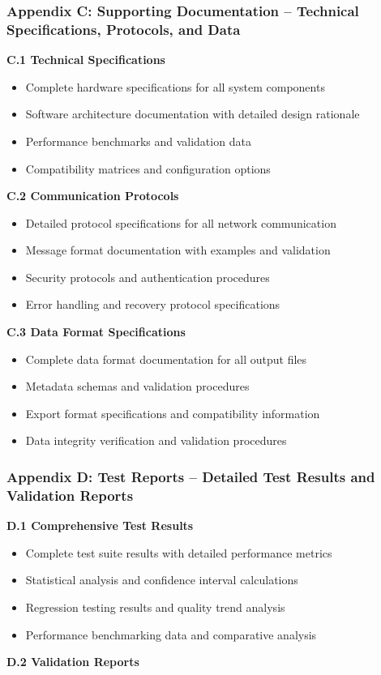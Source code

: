 \documentclass[12pt,a4paper]{report}
\begin{document}
\subsubsection{Appendix C: Supporting Documentation – Technical Specifications, Protocols, and Data}

\textbf{C.1 Technical Specifications}

\begin{itemize}
\item Complete hardware specifications for all system components
\item Software architecture documentation with detailed design rationale
\item Performance benchmarks and validation data
\item Compatibility matrices and configuration options

\end{itemize}
\textbf{C.2 Communication Protocols}

\begin{itemize}
\item Detailed protocol specifications for all network communication
\item Message format documentation with examples and validation
\item Security protocols and authentication procedures
\item Error handling and recovery protocol specifications

\end{itemize}
\textbf{C.3 Data Format Specifications}

\begin{itemize}
\item Complete data format documentation for all output files
\item Metadata schemas and validation procedures
\item Export format specifications and compatibility information
\item Data integrity verification and validation procedures

\end{itemize}
\subsubsection{Appendix D: Test Reports – Detailed Test Results and Validation Reports}

\textbf{D.1 Comprehensive Test Results}

\begin{itemize}
\item Complete test suite results with detailed performance metrics
\item Statistical analysis and confidence interval calculations
\item Regression testing results and quality trend analysis
\item Performance benchmarking data and comparative analysis

\end{itemize}
\textbf{D.2 Validation Reports}
\end{document}
